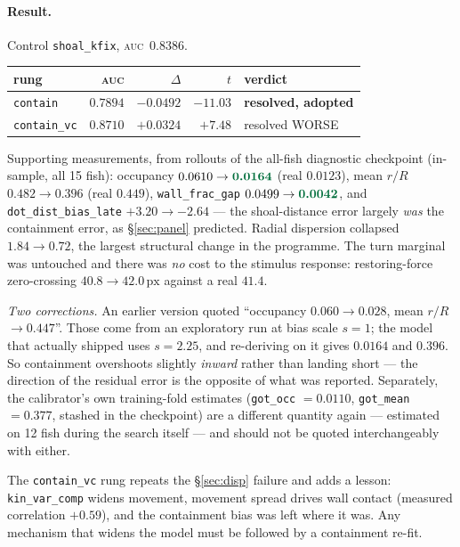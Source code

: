 \documentclass[11pt,a4paper]{article}
\newcommand{\uu}[1]{\ensuremath{\,\mathrm{#1}}}  %
\newcommand{\win}[1]{\textcolor{winc}{\textbf{#1}}}
\newcommand{\lose}[1]{\textcolor{losec}{#1}}
\newcommand{\auc}{\textsc{auc}}
\newcommand{\code}[1]{\texttt{\small #1}}
\begin{document}
\paragraph{Result.} Control \code{shoal\_kfix}, \auc\ $0.8386$.
\begin{center}\small
\begin{tabular}{lrrrl}
\toprule
rung & \auc{} & $\Delta$ & $t$ & verdict \\
\midrule
\code{contain}     & $\mathbf{0.7894}$ & $\mathbf{-0.0492}$ & $-11.03$ & \win{resolved, adopted} \\
\code{contain\_vc} & $0.8710$ & $+0.0324$ & $+7.48$ & \lose{resolved WORSE} \\
\bottomrule
\end{tabular}
\end{center}

Supporting measurements, from rollouts of the all-fish diagnostic checkpoint (in-sample,
all 15 fish): occupancy
$0.0610 \to \win{0.0164}$ (real $0.0123$), mean $r/R$ $0.482 \to 0.396$ (real $0.449$),
\code{wall\_frac\_gap} $0.0499 \to \win{0.0042}$, and \code{dot\_dist\_bias\_late}
$+3.20 \to -2.64$ --- the shoal-distance error largely \emph{was} the containment error, as
\S\ref{sec:panel} predicted. Radial dispersion collapsed $1.84 \to 0.72$, the largest
structural change in the programme. The turn marginal was untouched and there was \emph{no}
cost to the stimulus response: restoring-force zero-crossing $40.8 \to 42.0\uu{px}$ against
a real $41.4$.

\emph{Two corrections.} An earlier version quoted ``occupancy $0.060 \to 0.028$, mean $r/R$
$\to 0.447$''. Those come from an exploratory run at bias scale $s=1$; the model that
actually shipped uses $s=2.25$, and re-deriving on it gives $0.0164$ and $0.396$. So
containment overshoots slightly \emph{inward} rather than landing short --- the direction of
the residual error is the opposite of what was reported. Separately, the calibrator's own
training-fold estimates (\code{got\_occ} $=0.0110$, \code{got\_mean} $=0.377$, stashed in
the checkpoint) are a different quantity again --- estimated on 12 fish during the search
itself --- and should not be quoted interchangeably with either.

The \code{contain\_vc} rung repeats the \S\ref{sec:disp} failure and adds a lesson:
\code{kin\_var\_comp} widens movement, movement spread drives wall contact (measured
correlation $+0.59$), and the containment bias was left where it was. Any mechanism that
widens the model must be followed by a containment re-fit.
\end{document}
